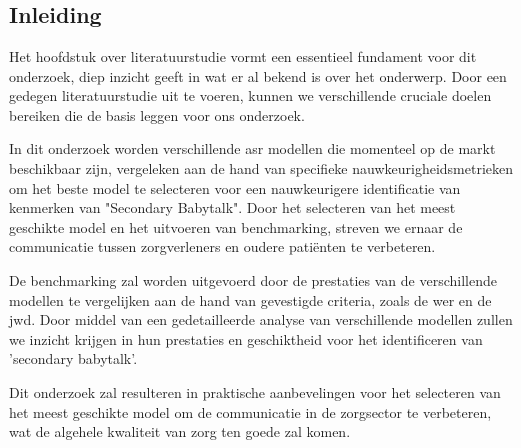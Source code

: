 \chapter{}%
\label{ch:stand-van-zaken}


\section{Inleiding}


Het hoofdstuk over literatuurstudie vormt een essentieel fundament voor dit onderzoek, diep inzicht ge­eft in wat er al beke­nd is over het onderwe­rp. Door een gedegen literatuurstudie uit te voeren, kunnen we verschillende cruciale doelen bereiken die de basis leggen voor ons onderzoek.

In dit onderzoek worden verschillende \gls{asr}  modellen die momenteel op de markt beschikbaar zijn, vergeleken aan de hand van specifieke nauwkeurigheidsmetrieken om het beste model te selecteren voor een nauwkeurigere identificatie van kenmerken van "Secondary Babytalk". Door het selecteren van het meest geschikte model en het uitvoeren van benchmarking, streven we ernaar de communicatie tussen zorgverleners en oudere patiënten te verbeteren. 


De benchmarking zal worden uitgevoerd door de prestaties van de verschillende modellen te vergelijken aan de hand van gevestigde criteria, zoals de \gls{wer} en de \gls{jwd}. 
Door middel van een gedetailleerde analyse van verschillende modellen zullen we inzicht krijgen in hun prestaties en geschiktheid voor het identificeren van 'secondary babytalk'. 


Dit onderzoek zal resulteren in praktische aanbevelingen voor het selecteren van het meest geschikte model om de communicatie in de zorgsector te verbeteren, wat de algehele kwaliteit van zorg ten goede zal komen.



